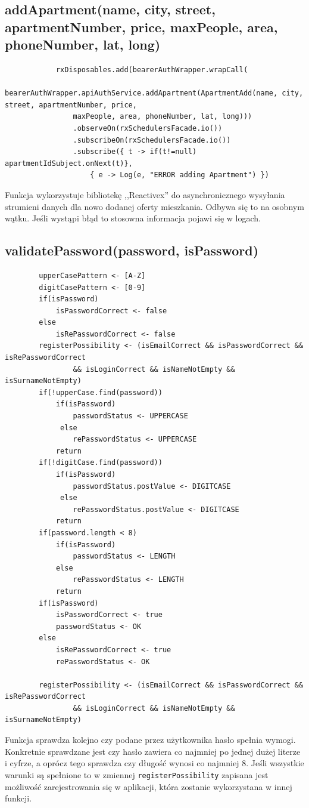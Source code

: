\documentclass[polish, 11pt]{article}
\begin{document}
    \subsection{addApartment(name, city, street, apartmentNumber, price, maxPeople, area, phoneNumber, lat, long)}
        \begin{lstlisting}
            rxDisposables.add(bearerAuthWrapper.wrapCall(
            bearerAuthWrapper.apiAuthService.addApartment(ApartmentAdd(name, city, street, apartmentNumber, price,
                maxPeople, area, phoneNumber, lat, long)))
                .observeOn(rxSchedulersFacade.io())
                .subscribeOn(rxSchedulersFacade.io())
                .subscribe({ t -> if(t!=null) apartmentIdSubject.onNext(t)},
                    { e -> Log(e, "ERROR adding Apartment") })
        \end{lstlisting}
        Funkcja wykorzystuje bibliotekę ,,Reactivex'' do asynchronicznego wysyłania strumieni danych dla nowo dodanej oferty mieszkania. Odbywa się to na osobnym wątku. Jeśli wystąpi błąd to stosowna informacja pojawi się w logach.
        
    \subsection{validatePassword(password, isPassword)}
         \begin{lstlisting}
        upperCasePattern <- [A-Z]
        digitCasePattern <- [0-9]
        if(isPassword)
            isPasswordCorrect <- false
        else 
            isRePasswordCorrect <- false
        registerPossibility <- (isEmailCorrect && isPasswordCorrect && isRePasswordCorrect
                && isLoginCorrect && isNameNotEmpty && isSurnameNotEmpty)
        if(!upperCase.find(password))
            if(isPassword)
                passwordStatus <- UPPERCASE
             else
                rePasswordStatus <- UPPERCASE
            return
        if(!digitCase.find(password))
            if(isPassword)
                passwordStatus.postValue <- DIGITCASE
             else
                rePasswordStatus.postValue <- DIGITCASE
            return
        if(password.length < 8)
            if(isPassword)
                passwordStatus <- LENGTH
            else
                rePasswordStatus <- LENGTH
            return
        if(isPassword)
            isPasswordCorrect <- true
            passwordStatus <- OK
        else 
            isRePasswordCorrect <- true
            rePasswordStatus <- OK
        
        registerPossibility <- (isEmailCorrect && isPasswordCorrect && isRePasswordCorrect
                && isLoginCorrect && isNameNotEmpty && isSurnameNotEmpty)
         \end{lstlisting}
         Funkcja sprawdza kolejno czy podane przez użytkownika hasło spełnia wymogi. Konkretnie sprawdzane jest czy hasło zawiera co najmniej po jednej dużej literze i cyfrze, a oprócz tego sprawdza czy długość wynosi co najmniej 8. Jeśli wszystkie warunki są spełnione to w zmiennej \texttt{registerPossibility} zapisana jest możliwość zarejestrowania się w aplikacji, która zostanie wykorzystana w innej funkcji.  
    
\end{document}
